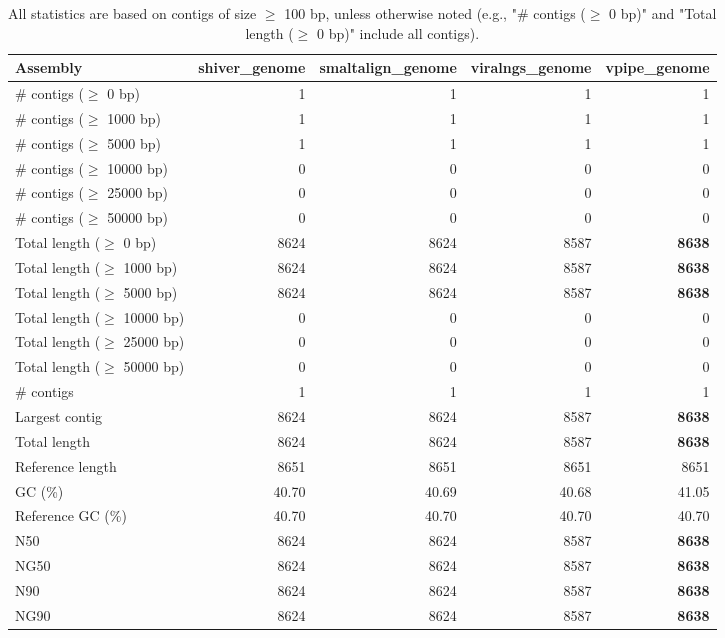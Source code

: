 \documentclass[12pt,a4paper]{article}
\begin{document}
\begin{table}[ht]
\begin{center}
\caption{All statistics are based on contigs of size $\geq$ 100 bp, unless otherwise noted (e.g., "\# contigs ($\geq$ 0 bp)" and "Total length ($\geq$ 0 bp)" include all contigs).}
\begin{tabular}{|l*{4}{|r}|}
\hline
Assembly & shiver\_genome & smaltalign\_genome & viralngs\_genome & vpipe\_genome \\ \hline
\# contigs ($\geq$ 0 bp) & 1 & 1 & 1 & 1 \\ \hline
\# contigs ($\geq$ 1000 bp) & 1 & 1 & 1 & 1 \\ \hline
\# contigs ($\geq$ 5000 bp) & 1 & 1 & 1 & 1 \\ \hline
\# contigs ($\geq$ 10000 bp) & 0 & 0 & 0 & 0 \\ \hline
\# contigs ($\geq$ 25000 bp) & 0 & 0 & 0 & 0 \\ \hline
\# contigs ($\geq$ 50000 bp) & 0 & 0 & 0 & 0 \\ \hline
Total length ($\geq$ 0 bp) & 8624 & 8624 & 8587 & {\bf 8638} \\ \hline
Total length ($\geq$ 1000 bp) & 8624 & 8624 & 8587 & {\bf 8638} \\ \hline
Total length ($\geq$ 5000 bp) & 8624 & 8624 & 8587 & {\bf 8638} \\ \hline
Total length ($\geq$ 10000 bp) & 0 & 0 & 0 & 0 \\ \hline
Total length ($\geq$ 25000 bp) & 0 & 0 & 0 & 0 \\ \hline
Total length ($\geq$ 50000 bp) & 0 & 0 & 0 & 0 \\ \hline
\# contigs & 1 & 1 & 1 & 1 \\ \hline
Largest contig & 8624 & 8624 & 8587 & {\bf 8638} \\ \hline
Total length & 8624 & 8624 & 8587 & {\bf 8638} \\ \hline
Reference length & 8651 & 8651 & 8651 & 8651 \\ \hline
GC (\%) & 40.70 & 40.69 & 40.68 & 41.05 \\ \hline
Reference GC (\%) & 40.70 & 40.70 & 40.70 & 40.70 \\ \hline
N50 & 8624 & 8624 & 8587 & {\bf 8638} \\ \hline
NG50 & 8624 & 8624 & 8587 & {\bf 8638} \\ \hline
N90 & 8624 & 8624 & 8587 & {\bf 8638} \\ \hline
NG90 & 8624 & 8624 & 8587 & {\bf 8638} \\ \hline

\end{tabular}
\end{center}
\end{table}
\end{document}

